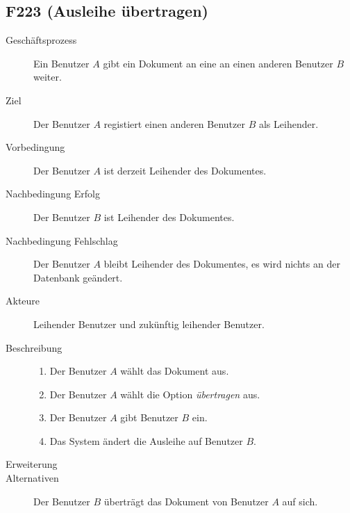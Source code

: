 \subsection{F223 (Ausleihe übertragen)}
\begin{description}
  \item[Geschäftsprozess]Ein Benutzer $A$ gibt ein Dokument an eine an einen anderen Benutzer $B$ weiter.
  \item[Ziel]Der Benutzer $A$ registiert einen anderen Benutzer $B$ als Leihender.
  \item[Vorbedingung]Der Benutzer $A$ ist derzeit Leihender des Dokumentes.
  \item[Nachbedingung Erfolg]Der Benutzer $B$ ist Leihender des Dokumentes.
  \item[Nachbedingung Fehlschlag]Der Benutzer $A$ bleibt Leihender des Dokumentes, es wird nichts an der Datenbank geändert.
  \item[Akteure]Leihender Benutzer und zukünftig leihender Benutzer.
  \item[Beschreibung]\hfill
    \begin{enumerate}
      \item Der Benutzer $A$ wählt das Dokument aus.
      \item Der Benutzer $A$ wählt die Option \emph{übertragen} aus.
      \item Der Benutzer $A$ gibt Benutzer $B$ ein.
      \item Das System ändert die Ausleihe auf Benutzer $B$.
    \end{enumerate}
  \item[Erweiterung]
  \item[Alternativen]Der Benutzer $B$  überträgt das Dokument von Benutzer $A$ auf sich.
\end{description}


